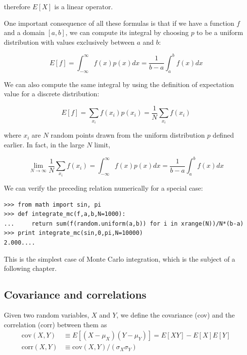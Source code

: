 \documentclass[justified,sixbynine]{tufte-book}
\def\ft{\small\tt}
\theoremstyle{plain}%
\theoremstyle{definition}
\theoremstyle{remark}
\begin{document}
\begin{fullwidth}
therefore $E[X]$ is a linear operator.

One important consequence of all these formulas is that if we have a function $f$ and a domain $[a,b]$, we can compute its integral by choosing $p$ to be a uniform distribution with values exclusively between $a$ and $b$:

\begin{equation}
  E[f] = \int_{-\infty }^\infty f(x) p(x) dx = \frac1{b-a}\int_a^b f(x) dx
\end{equation}

We can also compute the same integral by using the definition of expectation value for a discrete distribution:

\begin{equation}
  E[f] = \sum_{x_i} f(x_i) p(x_i) = \frac1N \sum_{x_i} f(x_i)
\end{equation}

where $x_i$ are $N$ random points drawn from the uniform distribution $p$ defined earlier. In fact, in the large $N$ limit,

\begin{equation}
  \lim_{N\rightarrow \infty}  \frac1N \sum_{x_i} f(x_i) = \int_{-\infty }^\infty f(x) p(x)dx = \frac1{b-a}\int_a^b f(x) dx
\end{equation}

We can verify the preceding relation numerically for a special case:

\begin{lstlisting}[caption={in file: {\ft nlib.py}}]
>>> from math import sin, pi
>>> def integrate_mc(f,a,b,N=1000):
...     return sum(f(random.uniform(a,b)) for i in xrange(N))/N*(b-a)
>>> print integrate_mc(sin,0,pi,N=10000)
2.000....
\end{lstlisting}

This is the simplest case of Monte Carlo integration, which is the subject of a following chapter.

\goodbreak\subsection{Covariance and correlations}

Given two random variables, $X$ and $Y$, we define the covariance (cov)  and the correlation (corr)
between
them as
\begin{align}
\textrm{cov}(X,Y) &\equiv  E[(X-\mu _X)(Y-\mu _Y)]=E[XY]-E[X]E[Y] \\
\textrm{corr}(X,Y) &\equiv  \textrm{cov}(X,Y)/(\sigma_X \sigma_Y)
\end{align}


\end{fullwidth}
\end{document}
